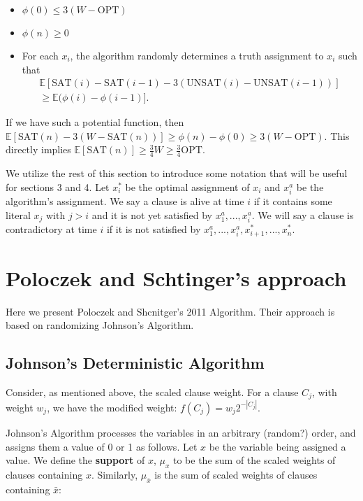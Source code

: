\documentclass[11pt,letter]{article}
\begin{document}
\begin{itemize}
	\item $\phi(0) \leq 3(W-\text{OPT})$
	\item $\phi(n) \geq 0$
	\item For each $x_i$, the algorithm randomly determines a truth assignment to $x_i$ such that
\begin{equation}
\begin{aligned}
\label{eq:2}
\mathbb{E}[\text{SAT}(i) - \text{SAT}(i-1) - 3\left(\text{UNSAT}(i)-\text{UNSAT}(i-1)\right)] \\
\geq \mathbb{E}(\phi(i) - \phi(i-1)].
\end{aligned}
\end{equation}
\end{itemize}

If we have such a potential function, then $\mathbb{E}[\text{SAT}(n)- 3\left(W-\text{SAT}(n)\right)] \geq \phi(n) - \phi(0) \geq 3(W-\text{OPT})$.
This directly implies $\mathbb{E}[\text{SAT}(n)] \geq \frac{3}{4} W \geq \frac{3}{4} \text{OPT}$.

We utilize the rest of this section to introduce some notation that will be useful for sections 3 and 4.
Let $x_i^*$ be the optimal assignment of $x_i$ and $x_i^{a}$ be the algorithm's assignment. We say a clause is alive
at time $i$ if it contains some literal $x_j$ with $j > i$ and it is not yet satisfied by $x_1^a,...,x_i^a$.
We will say a clause is contradictory at time $i$ if it is not satisfied by $x_1^a,...,x_i^a,x_{i+1}^*,...,x_n^*$.

\section{Poloczek and Schtinger's approach}\label{S:PS}

Here we present Poloczek and Shcnitger's 2011 Algorithm. Their approach is based on randomizing Johnson's Algorithm.

\subsection{Johnson's Deterministic Algorithm}

Consider, as mentioned above, the scaled clause weight. For a clause $C_j$, with weight $w_j$, we have the modified weight:  $f(C_j) = w_j 2^{-|C_j|}$.

Johnson's Algorithm processes the variables in an arbitrary (random?) order, and assigns them a value of 0 or 1 as follows. Let $x$ be the variable being assigned a value. We define the \textbf{support} of $x$, $\mu_x$ to be the sum of the scaled weights of clauses containing $x$. Similarly, $\mu_{\bar{x}}$ is the sum of scaled weights of clauses containing $\bar{x}$:
\end{document}
